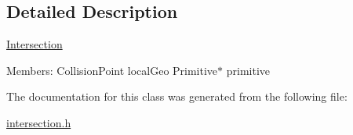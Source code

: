 \subsection{Detailed Description}
\mbox{\hyperlink{class_intersection}{Intersection}}

Members\+: Collision\+Point local\+Geo Primitive$\ast$ primitive 

The documentation for this class was generated from the following file\+:\begin{DoxyCompactItemize}
\item 
\mbox{\hyperlink{intersection_8h}{intersection.\+h}}\end{DoxyCompactItemize}
